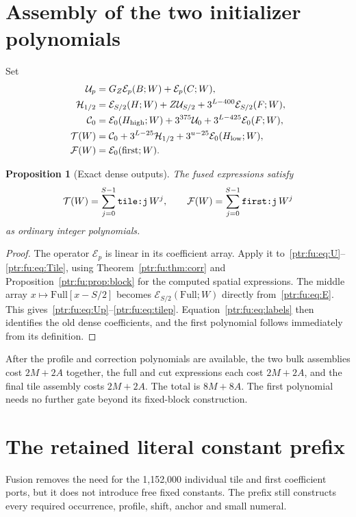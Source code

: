 \documentclass[11pt,letterpaper]{article}
\newtheorem{proposition}[theorem]{Proposition}
\theoremstyle{definition}\newtheorem{definition}[theorem]{Definition}
\theoremstyle{remark}\newtheorem{remark}[theorem]{Remark}
\newcommand{\op}[1]{\mathrm{#1}}
\newcommand{\code}[1]{\texttt{\detokenize{#1}}}
\newcommand{\E}{\mathcal E}\newcommand{\calQ}{\mathcal Q}\newcommand{\calL}{\mathcal L}
\newcommand{\calT}{\mathcal T}\newcommand{\calF}{\mathcal F}
\begin{document}
\section{Assembly of the two initializer polynomials}\label{ptr:fu:sec:assembly}
Set
\begin{align}
 \mathcal U_p&=G_Z\E_p(B;W)+\E_p(C;W),\label{ptr:fu:eq:Up}\\
 \mathcal H_{1/2}&=\E_{S/2}(H;W)+Z\mathcal U_{S/2}
                          +3^{L-400}\E_{S/2}(F;W),\label{ptr:fu:eq:fullp}\\
 \mathcal C_0&=\E_0(H_{\rm high};W)+3^{375}\mathcal U_0
                          +3^{L-425}\E_0(F;W),\label{ptr:fu:eq:cutp}\\
 \calT(W)&=\mathcal C_0+3^{L-25}\mathcal H_{1/2}
                          +3^{u-25}\E_0(H_{\rm low};W),\label{ptr:fu:eq:tilep}\\
 \calF(W)&=\E_0(\op{first};W).\label{ptr:fu:eq:firstp}
\end{align}
\begin{proposition}[Exact dense outputs]\label{ptr:fu:prop:dense}
The fused expressions satisfy
\[
 \calT(W)=\sum_{j=0}^{S-1}\code{tile:j}\,W^j,\qquad
 \calF(W)=\sum_{j=0}^{S-1}\code{first:j}\,W^j
\]
as ordinary integer polynomials.
\end{proposition}
\begin{proof}
The operator $\E_p$ is linear in its coefficient array. Apply it to~\eqref{ptr:fu:eq:U}--\eqref{ptr:fu:eq:Tile}, using Theorem~\ref{ptr:fu:thm:corr} and Proposition~\ref{ptr:fu:prop:block} for the computed spatial expressions. The middle array $x\mapsto\op{Full}[x-S/2]$ becomes $\E_{S/2}(\op{Full};W)$ directly from~\eqref{ptr:fu:eq:E}. This gives~\eqref{ptr:fu:eq:Up}--\eqref{ptr:fu:eq:tilep}. Equation~\eqref{ptr:fu:eq:labels} then identifies the old dense coefficients, and the first polynomial follows immediately from its definition.
\end{proof}
After the profile and correction polynomials are available, the two bulk assemblies cost $2M+2A$ together, the full and cut expressions each cost $2M+2A$, and the final tile assembly costs $2M+2A$. The total is $8M+8A$. The first polynomial needs no further gate beyond its fixed-block construction.

\section{The retained literal constant prefix}\label{ptr:fu:sec:prefix}
Fusion removes the need for the 1,152,000 individual tile and first coefficient ports, but it does not introduce free fixed constants. The prefix still constructs every required occurrence, profile, shift, anchor and small numeral.
\end{document}
